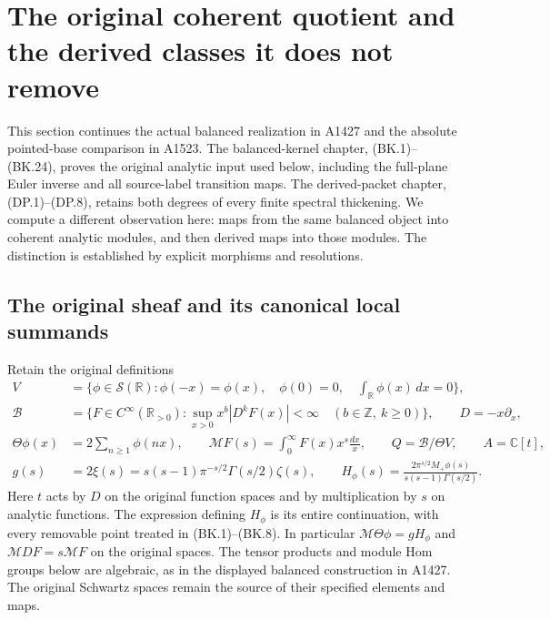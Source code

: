 \section{The original coherent quotient and the derived classes it does not remove}
\label{CFStage:sec:original-coherent-comparison}

This section continues the actual balanced realization in A1427 and the
absolute pointed-base comparison in A1523.  The balanced-kernel chapter,
(BK.1)--(BK.24), proves the original analytic input used below, including
the full-plane Euler inverse and all source-label transition maps.
The derived-packet chapter, (DP.1)--(DP.8), retains both degrees of every
finite spectral thickening.  We compute a different observation here:
maps from the same balanced object into coherent analytic modules, and
then derived maps into those modules.  The distinction is established by
explicit morphisms and resolutions.

\subsection{The original sheaf and its canonical local summands}

Retain the original definitions
\[
\begin{split}
 V&=\{\phi\in\mathcal S(\mathbb R):\phi(-x)=\phi(x),\quad
       \phi(0)=0,\quad\textstyle\int_{\mathbb R}\phi(x)\,dx=0\},\\
 \mathscr B&=\{F\in C^\infty(\mathbb R_{>0}):
   \sup_{x>0}x^b|D^kF(x)|<\infty\quad(b\in\mathbb Z,\ k\ge0)\},
       \qquad D=-x\partial_x,\\
 \Theta\phi(x)&=2\sum_{n\ge1}\phi(nx),\qquad
 \mathcal MF(s)=\int_0^\infty F(x)x^s\frac{dx}{x},\qquad
 Q=\mathscr B/\Theta V,\qquad A=\mathbb C[t],\\
 g(s)&=2\xi(s)=s(s-1)\pi^{-s/2}\Gamma(s/2)\zeta(s),\qquad
 H_\phi(s)=\frac{2\pi^{s/2}M_+\phi(s)}{s(s-1)\Gamma(s/2)}.
\end{split}                                                     \tag{OCQ.1}
\]
Here $t$ acts by $D$ on the original function spaces and by multiplication
by $s$ on analytic functions.  The expression defining $H_\phi$ is its
entire continuation, with every removable point treated in (BK.1)--(BK.8).
In particular $\mathcal M\Theta\phi=gH_\phi$ and
$\mathcal M DF=s\mathcal MF$ on the original spaces.
The tensor products and module Hom groups below are algebraic, as in
the displayed balanced construction in A1427.  The original Schwartz
spaces remain the source of their specified elements and maps.

